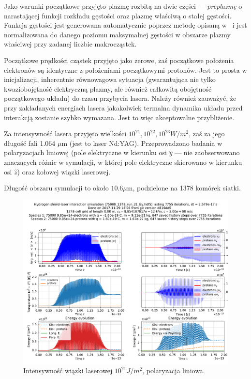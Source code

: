 Jako warunki początkowe przyjęto plazmę rozbitą na dwie części ---
\emph{preplazmę} o narastającej funkcji rozkładu gęstości oraz plazmę właściwą
o stałej gęstości. Funkcja gęstości jest generowana automatycznie poprzez
metodę opisaną w~\cite{birdsall} i jest normalizowana do danego poziomu
maksymalnej gęstości w obszarze plazmy właściwej przy zadanej liczbie
makrocząstek.

Początkowe prędkości cząstek przyjęto jako zerowe, zaś początkowe położenia
elektronów są identyczne z położeniami początkowymi protonów. Jest to prosta
w inicjalizacji, inherentnie równowagowa sytuacja (gwarantująca nie tylko
kwaziobojętność elektryczną plazmy, ale również całkowitą obojętność
początkowego układu) do czasu przybycia lasera. Należy również zauważyć, że
przy zakładanych energiach lasera jakakolwiek termalna dynamika układu przed
interakcją zostanie szybko wymazana. Jest to więc akceptowalne przybliżenie.

Za intensywność lasera przyjęto wielkości $10^{21}, 10^{22}, 10^{23} W/m^2$,
zaś za jego długość fali 1.064 $\mu$m (jest to laser Nd:YAG). Przeprowadzono
badania w polaryzacjach liniowej (pole elektryczne w kierunku osi $\hat{y}$ ---
nie zaobserwowano znaczących różnic w symulacji, w której pole elektryczne
skierowano w kierunku osi $\hat{z}$) %
oraz kołowej wiązki laserowej.

Długość obszaru symulacji to około $10.6 \mu$m, podzielone na 1378 komórek siatki.

\begin{figure}[h!]
  \includegraphics[width=\textwidth]{Images/75000_1378_run_21_Ey}
  \caption{Intensywność wiązki laserowej $10^{21} J/m^2$, polaryzacja liniowa.\label{fig:laser-21-Ey}}
\end{figure}

